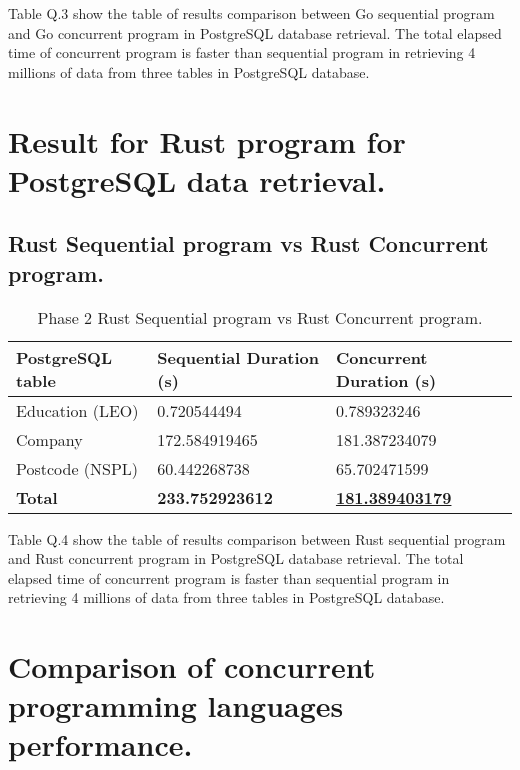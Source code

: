 Table Q.3 show the table of results comparison between Go sequential program and Go concurrent program in PostgreSQL database retrieval. The total elapsed time of concurrent program is faster than sequential program in retrieving 4 millions of data from three tables in PostgreSQL database.

\newpage

\section{Result for Rust program for PostgreSQL data retrieval.}

\subsection{Rust Sequential program vs Rust Concurrent program.}

\begin{table}[H]
	\centering
	\begin{tabulary}{1.0\textwidth}{|L|L|L|}
		\hline
		{\bf{PostgreSQL table}} & {\bf Sequential Duration (s)} & {\bf Concurrent Duration (s)}  \\ \hline
		Education (LEO)		& 0.720544494     			  	& 0.789323246                    	 \\ \hline
		Company				& 172.584919465    				& 181.387234079                       \\ \hline
		Postcode (NSPL) 	& 60.442268738       			& 65.702471599                       \\ \hline
		\bf{Total}   		& \textbf{233.752923612}  			& \bf{\underline{181.389403179}}       \\ \hline
	\end{tabulary}
	\caption{Phase 2 Rust Sequential program vs Rust Concurrent program.}
\end{table}

Table Q.4 show the table of results comparison between Rust sequential program and Rust concurrent program in PostgreSQL database retrieval. The total elapsed time of concurrent program is faster than sequential program in retrieving 4 millions of data from three tables in PostgreSQL database.

\newpage

\section{Comparison of concurrent programming languages performance.}

